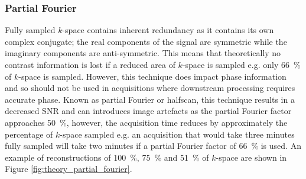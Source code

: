 \subsubsection{Partial Fourier}
\label{subsec:theory_partial_fourier}
Fully sampled $k$-space contains inherent redundancy as it contains its own complex conjugate; the real components of the signal are symmetric while the imaginary components are anti-symmetric. This means that theoretically no contrast information is lost if a reduced area of $k$-space is sampled e.g. only 66~\% of $k$-space is sampled. However, this technique does impact phase information and so should not be used in acquisitions where downstream processing requires accurate phase. Known as partial Fourier or halfscan, this technique results in a decreased \ac{SNR} and can introduces image artefacts as the partial Fourier factor approaches 50~\%, however, the acquisition time reduces by approximately the percentage of $k$-space sampled e.g. an acquisition that would take three minutes fully sampled will take two minutes if a partial Fourier factor of 66~\% is used. An example of reconstructions of 100~\%, 75~\% and 51~\% of $k$-space are shown in Figure \ref{fig:theory_partial_fourier}.

